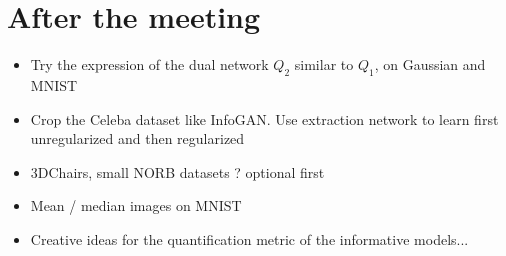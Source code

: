 \documentclass[11pt,a4paper]{article}
\begin{document}
\section{After the meeting}
\begin{itemize}
    \item
        Try the expression of the dual network $Q_2$ similar to $Q_1$, on Gaussian and MNIST
    \item
        Crop the Celeba dataset like InfoGAN. Use extraction network to learn first unregularized and then regularized
    \item
        3DChairs, small NORB datasets ? optional first
    \item
        Mean / median images on MNIST
    \item
        Creative ideas for the quantification metric of the informative models...
\end{itemize}

% 
% 
% 
% 
% 
% 
% 
% 

\printbibliography{}
\end{document}
